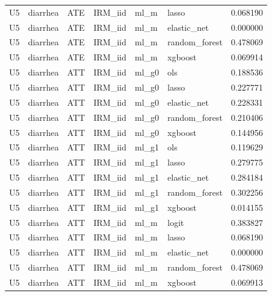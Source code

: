 \begin{longtable}{llllllr}
U5 & diarrhea & ATE & IRM\_iid & ml\_m & lasso & 0.068190 \\
U5 & diarrhea & ATE & IRM\_iid & ml\_m & elastic\_net & 0.000000 \\
U5 & diarrhea & ATE & IRM\_iid & ml\_m & random\_forest & 0.478069 \\
U5 & diarrhea & ATE & IRM\_iid & ml\_m & xgboost & 0.069914 \\
U5 & diarrhea & ATT & IRM\_iid & ml\_g0 & ols & 0.188536 \\
U5 & diarrhea & ATT & IRM\_iid & ml\_g0 & lasso & 0.227771 \\
U5 & diarrhea & ATT & IRM\_iid & ml\_g0 & elastic\_net & 0.228331 \\
U5 & diarrhea & ATT & IRM\_iid & ml\_g0 & random\_forest & 0.210406 \\
U5 & diarrhea & ATT & IRM\_iid & ml\_g0 & xgboost & 0.144956 \\
U5 & diarrhea & ATT & IRM\_iid & ml\_g1 & ols & 0.119629 \\
U5 & diarrhea & ATT & IRM\_iid & ml\_g1 & lasso & 0.279775 \\
U5 & diarrhea & ATT & IRM\_iid & ml\_g1 & elastic\_net & 0.284184 \\
U5 & diarrhea & ATT & IRM\_iid & ml\_g1 & random\_forest & 0.302256 \\
U5 & diarrhea & ATT & IRM\_iid & ml\_g1 & xgboost & 0.014155 \\
U5 & diarrhea & ATT & IRM\_iid & ml\_m & logit & 0.383827 \\
U5 & diarrhea & ATT & IRM\_iid & ml\_m & lasso & 0.068190 \\
U5 & diarrhea & ATT & IRM\_iid & ml\_m & elastic\_net & 0.000000 \\
U5 & diarrhea & ATT & IRM\_iid & ml\_m & random\_forest & 0.478069 \\
U5 & diarrhea & ATT & IRM\_iid & ml\_m & xgboost & 0.069913 \\
\end{longtable}
